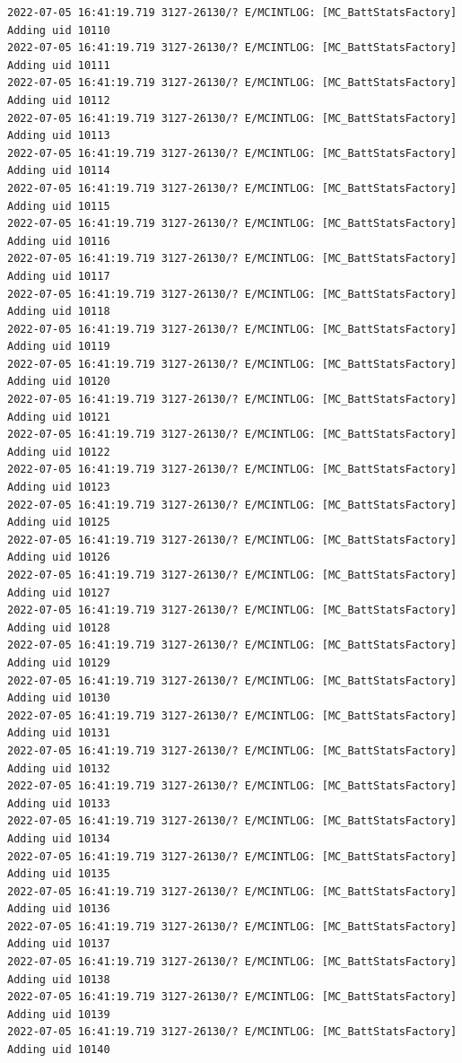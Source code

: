 \documentclass[a4paper,12pt]{book}
\begin{document}
\begin{lstlisting}
2022-07-05 16:41:19.719 3127-26130/? E/MCINTLOG: [MC_BattStatsFactory] Adding uid 10110
2022-07-05 16:41:19.719 3127-26130/? E/MCINTLOG: [MC_BattStatsFactory] Adding uid 10111
2022-07-05 16:41:19.719 3127-26130/? E/MCINTLOG: [MC_BattStatsFactory] Adding uid 10112
2022-07-05 16:41:19.719 3127-26130/? E/MCINTLOG: [MC_BattStatsFactory] Adding uid 10113
2022-07-05 16:41:19.719 3127-26130/? E/MCINTLOG: [MC_BattStatsFactory] Adding uid 10114
2022-07-05 16:41:19.719 3127-26130/? E/MCINTLOG: [MC_BattStatsFactory] Adding uid 10115
2022-07-05 16:41:19.719 3127-26130/? E/MCINTLOG: [MC_BattStatsFactory] Adding uid 10116
2022-07-05 16:41:19.719 3127-26130/? E/MCINTLOG: [MC_BattStatsFactory] Adding uid 10117
2022-07-05 16:41:19.719 3127-26130/? E/MCINTLOG: [MC_BattStatsFactory] Adding uid 10118
2022-07-05 16:41:19.719 3127-26130/? E/MCINTLOG: [MC_BattStatsFactory] Adding uid 10119
2022-07-05 16:41:19.719 3127-26130/? E/MCINTLOG: [MC_BattStatsFactory] Adding uid 10120
2022-07-05 16:41:19.719 3127-26130/? E/MCINTLOG: [MC_BattStatsFactory] Adding uid 10121
2022-07-05 16:41:19.719 3127-26130/? E/MCINTLOG: [MC_BattStatsFactory] Adding uid 10122
2022-07-05 16:41:19.719 3127-26130/? E/MCINTLOG: [MC_BattStatsFactory] Adding uid 10123
2022-07-05 16:41:19.719 3127-26130/? E/MCINTLOG: [MC_BattStatsFactory] Adding uid 10125
2022-07-05 16:41:19.719 3127-26130/? E/MCINTLOG: [MC_BattStatsFactory] Adding uid 10126
2022-07-05 16:41:19.719 3127-26130/? E/MCINTLOG: [MC_BattStatsFactory] Adding uid 10127
2022-07-05 16:41:19.719 3127-26130/? E/MCINTLOG: [MC_BattStatsFactory] Adding uid 10128
2022-07-05 16:41:19.719 3127-26130/? E/MCINTLOG: [MC_BattStatsFactory] Adding uid 10129
2022-07-05 16:41:19.719 3127-26130/? E/MCINTLOG: [MC_BattStatsFactory] Adding uid 10130
2022-07-05 16:41:19.719 3127-26130/? E/MCINTLOG: [MC_BattStatsFactory] Adding uid 10131
2022-07-05 16:41:19.719 3127-26130/? E/MCINTLOG: [MC_BattStatsFactory] Adding uid 10132
2022-07-05 16:41:19.719 3127-26130/? E/MCINTLOG: [MC_BattStatsFactory] Adding uid 10133
2022-07-05 16:41:19.719 3127-26130/? E/MCINTLOG: [MC_BattStatsFactory] Adding uid 10134
2022-07-05 16:41:19.719 3127-26130/? E/MCINTLOG: [MC_BattStatsFactory] Adding uid 10135
2022-07-05 16:41:19.719 3127-26130/? E/MCINTLOG: [MC_BattStatsFactory] Adding uid 10136
2022-07-05 16:41:19.719 3127-26130/? E/MCINTLOG: [MC_BattStatsFactory] Adding uid 10137
2022-07-05 16:41:19.719 3127-26130/? E/MCINTLOG: [MC_BattStatsFactory] Adding uid 10138
2022-07-05 16:41:19.719 3127-26130/? E/MCINTLOG: [MC_BattStatsFactory] Adding uid 10139
2022-07-05 16:41:19.719 3127-26130/? E/MCINTLOG: [MC_BattStatsFactory] Adding uid 10140

\end{lstlisting}
\end{document}
